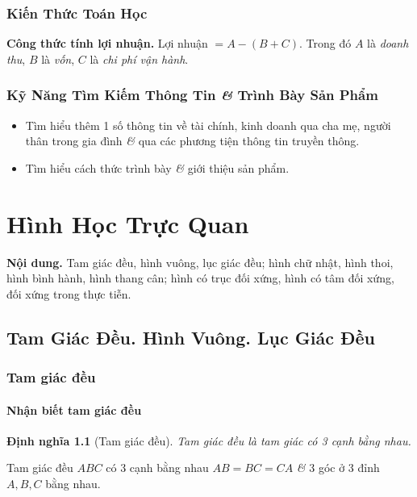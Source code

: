 \documentclass[oneside]{book}
\numberwithin{equation}{section}
\newtheorem{dinhnghia}{Định nghĩa}[section]
\begin{document}
\subsection{Kiến Thức Toán Học}

\begin{tcolorbox}
	\textbf{Công thức tính lợi nhuận.} Lợi nhuận $= A - (B + C)$. Trong đó $A$ là \textit{doanh thu}, $B$ là \textit{vốn}, $C$ là \textit{chi phí vận hành}.
\end{tcolorbox}

\subsection{Kỹ Năng Tìm Kiếm Thông Tin \textit{\&} Trình Bày Sản Phẩm}

\begin{itemize}
	\item Tìm hiểu thêm 1 số thông tin về tài chính, kinh doanh qua cha mẹ, người thân trong gia đình \textit{\&} qua các phương tiện thông tin truyền thông.
	\item Tìm hiểu cách thức trình bày \textit{\&} giới thiệu sản phẩm.
\end{itemize}


\chapter{Hình Học Trực Quan}
\textbf{Nội dung.} Tam giác đều, hình vuông, lục giác đều; hình chữ nhật, hình thoi, hình bình hành, hình thang cân; hình có trục đối xứng, hình có tâm đối xứng, đối xứng trong thực tiễn.

\section{Tam Giác Đều. Hình Vuông. Lục Giác Đều}

\subsection{Tam giác đều}

\subsubsection{Nhận biết tam giác đều}
\begin{dinhnghia}[Tam giác đều]
	\emph{Tam giác đều} là tam giác có 3 cạnh bằng nhau.
\end{dinhnghia}
Tam giác đều $ABC$ có 3 cạnh bằng nhau $AB = BC = CA$ \textit{\&} 3 góc ở 3 đỉnh $A,B,C$ bằng nhau.
\end{document}
